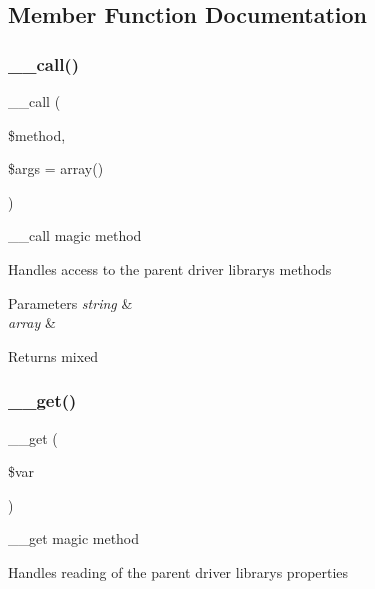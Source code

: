 \subsection{Member Function Documentation}
\mbox{\label{class_c_i___driver_a57936fde7f1adea3f3e7dfca474a1786}} 
\subsubsection{\texorpdfstring{\+\_\+\+\_\+call()}{\_\_call()}}
{\footnotesize\ttfamily \+\_\+\+\_\+call (\begin{DoxyParamCaption}\item[{}]{\$method,  }\item[{}]{\$args = {\ttfamily array()} }\end{DoxyParamCaption})}

\+\_\+\+\_\+call magic method

Handles access to the parent driver library\textquotesingle{}s methods


\begin{DoxyParams}{Parameters}
{\em string} & \\
\hline
{\em array} & \\
\hline
\end{DoxyParams}
\begin{DoxyReturn}{Returns}
mixed 
\end{DoxyReturn}
\mbox{\label{class_c_i___driver_a8fb2d9cdca17b87400e780b9f9720933}} 
\subsubsection{\texorpdfstring{\+\_\+\+\_\+get()}{\_\_get()}}
{\footnotesize\ttfamily \+\_\+\+\_\+get (\begin{DoxyParamCaption}\item[{}]{\$var }\end{DoxyParamCaption})}

\+\_\+\+\_\+get magic method

Handles reading of the parent driver library\textquotesingle{}s properties


